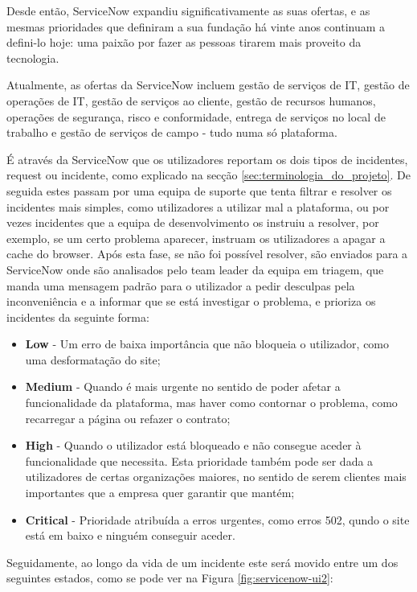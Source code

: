             Desde então, ServiceNow expandiu significativamente as suas ofertas, e as mesmas prioridades que definiram a sua fundação há vinte anos continuam a defini-lo hoje: uma paixão por fazer as pessoas tirarem mais proveito da tecnologia. 
            
            Atualmente, as ofertas da ServiceNow incluem gestão de serviços de IT, gestão de operações de IT, gestão de serviços ao cliente, gestão de recursos humanos, operações de segurança, risco e conformidade, entrega de serviços no local de trabalho e gestão de serviços de campo - tudo numa só plataforma.

            É através da ServiceNow que os utilizadores reportam os dois tipos de incidentes, request ou incidente, como explicado na secção \ref{sec:terminologia_do_projeto}. De seguida estes passam por uma equipa de suporte que tenta filtrar e resolver os incidentes mais simples, como utilizadores a utilizar mal a plataforma, ou por vezes incidentes que a equipa de desenvolvimento os instruiu a resolver, por exemplo, se um certo problema aparecer, instruam os utilizadores a apagar a cache do browser. Após esta fase, se não foi possível resolver, são enviados para a ServiceNow onde são analisados pelo team leader da equipa em triagem, que manda uma mensagem padrão para o utilizador a pedir desculpas pela inconveniência e a informar que se está investigar o problema, e prioriza os incidentes da seguinte forma:
            \begin{itemize}
                \item \textbf{Low} - Um erro de baixa importância que não bloqueia o utilizador, como uma desformatação do site;
                \item \textbf{Medium} - Quando é mais urgente no sentido de poder afetar a funcionalidade da plataforma, mas haver como contornar o problema, como recarregar a página ou refazer o contrato;
                \item \textbf{High} - Quando o utilizador está bloqueado e não consegue aceder à funcionalidade que necessita. Esta prioridade também pode ser dada a utilizadores de certas organizações maiores, no sentido de serem clientes mais importantes que a empresa quer garantir que mantém;
                \item \textbf{Critical} - Prioridade atribuída a erros urgentes, como erros 502, qundo o site está em baixo e ninguém conseguir aceder.
            \end{itemize}
            Seguidamente, ao longo da vida de um incidente este será movido entre um dos seguintes estados, como se pode ver na Figura \ref{fig:servicenow-ui2}:
